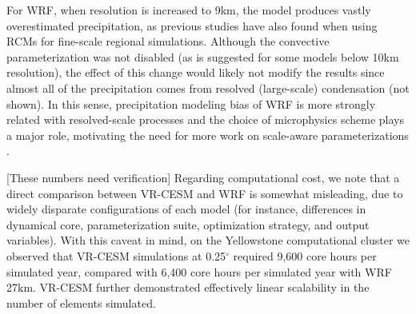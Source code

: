 \documentclass[draft,ms]{agutex}   %
\begin{document}
\begin{article}
For WRF, when resolution is increased to 9km, the model produces vastly overestimated precipitation, as previous studies have also found when using RCMs for fine-scale regional simulations. Although the convective parameterization was not disabled (as is suggested for some models below 10km resolution), the effect of this change would likely not modify the results since almost all of the precipitation comes from resolved (large-scale) condensation (not shown). In this sense, precipitation modeling bias of WRF is more strongly related with resolved-scale processes and the choice of microphysics scheme plays a major role, motivating the need for more work on scale-aware parameterizations \citep{o2013observed}. 

{\color{red}[These numbers need verification] Regarding computational cost, we note that a direct comparison between VR-CESM and WRF is somewhat misleading, due to widely disparate configurations of each model (for instance, differences in dynamical core, parameterization suite, optimization strategy, and output variables).  With this caveat in mind, on the Yellowstone computational cluster we observed that VR-CESM simulations at 0.25$^\circ$ required 9,600 core hours per simulated year, compared with 6,400 core hours per simulated year with WRF 27km.  VR-CESM further demonstrated effectively linear scalability in the number of elements simulated.}



\end{article}
\end{document}
